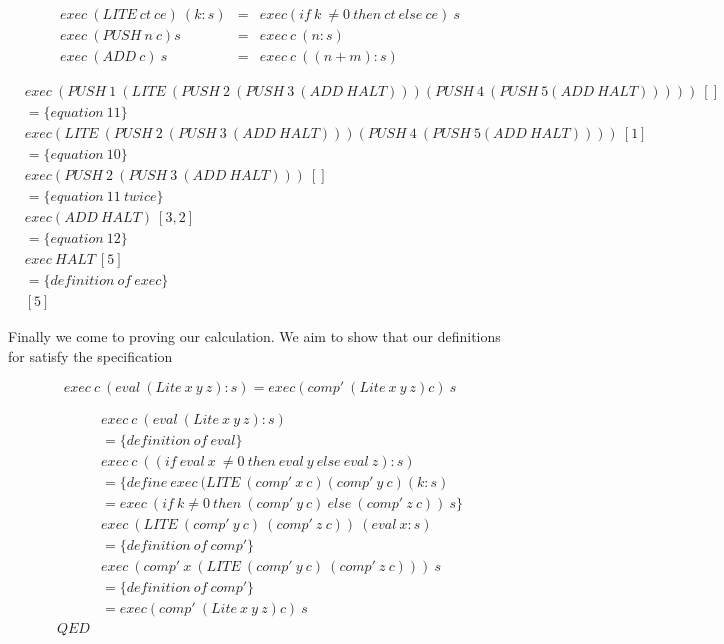 \documentclass {article}
\begin{document}
\begin{eqnarray}
	exec \  (LITE \ ct \ ce) \ (k:s) &=&  exec (if \ k \ \not= 0 \ then \ ct \ else \ ce) \ s \\
	exec \ (PUSH \ n \ c) s         &=&  exec \ c \ (n:s) \\
	exec \  (ADD \ c) \ s     &=&  exec \ c \ ((n+m) : s) 
\end{eqnarray}

\begin{align*}
	&exec \ (PUSH \ 1 \ (LITE \ (PUSH \ 2 \ (PUSH \ 3 \ (ADD \ HALT))) (PUSH \ 4 \ (PUSH \ 5 (ADD \ HALT))))) \ [] \\
	&=\{equation \ 11 \} \\
	&exec (LITE \ (PUSH \ 2 \ (PUSH \ 3 \ (ADD \ HALT))) (PUSH \ 4 \ (PUSH \ 5 (ADD \ HALT)))) \ [1] \\
	&=\{equation \ 10 \} \\
	&exec (PUSH \ 2 \ (PUSH \ 3 \ (ADD \ HALT))) \ [] \\
	&=\{equation \ 11 \ twice \} \\
	&exec (ADD \ HALT) \ [3, 2] \\
	&=\{equation \ 12 \} \\
	&exec \ HALT \ [5] \\
	&= \{definition \ of \ exec \} \\
	&[5]
\end{align*}


Finally we come to proving our calculation.
We aim to show that our definitions for \lite
satisfy the specification

	\[ exec \ c \ (eval \ (Lite \ x \ y \ z):s) = exec (comp' \ (Lite \ x \ y \ z) c)  \ s  \]

\begin{align*}
	&exec \ c \ (eval \ (Lite \ x \ y \ z):s) \\
	&= \{ definition \ of \ eval \} \\
	&exec \ c \ ((if \ eval \ x \ \not= 0 \ then \ eval \ y \ else \ eval \ z) :s) \\
	&= \{ define\: exec \ (LITE \ (comp' \ x \ c) (comp' \ y \ c) (k : s) \\
	&= exec \ (if \ k \not=0 \ then \ (comp' \ y \ c) \ else \ (comp' \ z \ c)) \ s \} \\
	& exec \ (LITE \ (comp' \ y \ c) \ (comp' \ z \ c)) \ (eval \ x : s) \\
	&= \{ definition \ of \ comp' \} \\
	& exec \ (comp' \ x \ (LITE \ 
							(comp' \ y \ c) \ 
							(comp' \ z \ c))) \ s \\
	&= \{definition \ of \ comp' \} \\
	&= exec (comp' \ (Lite \ x \ y \ z) c)  \ s \\
	QED
\end{align*}
\end{document}
